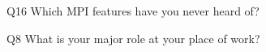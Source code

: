 \begin{description}%
\item{Q16} Which MPI features have you never heard of?%
\item{Q8} What is your major role at your place of work?%
\end{description}%
